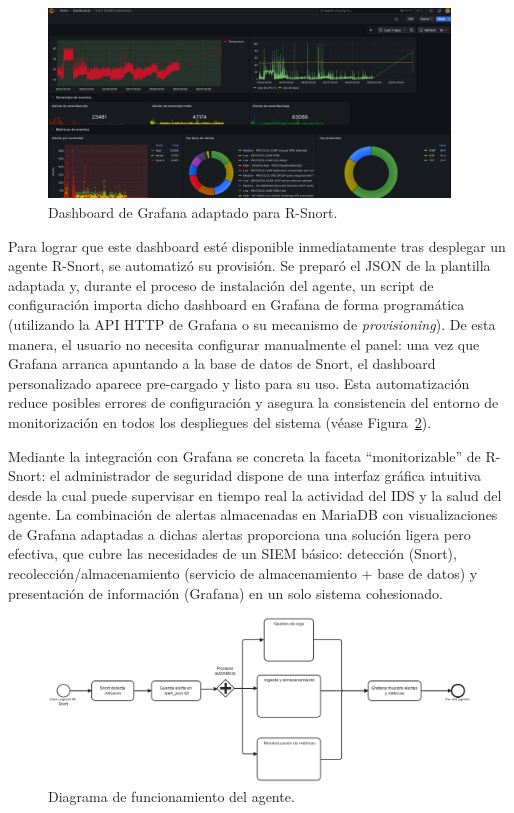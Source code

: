 \documentclass[11pt,a4paper,twoside]{report}
\begin{document}
\begin{figure}[H]
	\centering
	\includegraphics[width=0.95\textwidth]{documento/grafana1.png}
	\caption{Dashboard de Grafana adaptado para R-Snort.}
	\label{fig:grafana-dashboard}
\end{figure}

Para lograr que este dashboard esté disponible inmediatamente tras desplegar un agente R-Snort, se automatizó su provisión. Se preparó el JSON de la plantilla adaptada y, durante el proceso de instalación del agente, un script de configuración importa dicho dashboard en Grafana de forma programática (utilizando la API HTTP de Grafana o su mecanismo de \textit{provisioning}). De esta manera, el usuario no necesita configurar manualmente el panel: una vez que Grafana arranca apuntando a la base de datos de Snort, el dashboard personalizado aparece pre-cargado y listo para su uso. Esta automatización reduce posibles errores de configuración y asegura la consistencia del entorno de monitorización en todos los despliegues del sistema (véase Figura~\ref{fig:agent-bpmn}).\newline

Mediante la integración con Grafana se concreta la faceta “monitorizable” de R-Snort: el administrador de seguridad dispone de una interfaz gráfica intuitiva desde la cual puede supervisar en tiempo real la actividad del IDS y la salud del agente. La combinación de alertas almacenadas en MariaDB con visualizaciones de Grafana adaptadas a dichas alertas proporciona una solución ligera pero efectiva, que cubre las necesidades de un SIEM básico: detección (Snort), recolección/almacenamiento (servicio de almacenamiento + base de datos) y presentación de información (Grafana) en un solo sistema cohesionado.

\begin{figure}[H]
	\centering
	\includegraphics[width=1\textwidth]{documento/26.png}
	\caption{Diagrama de funcionamiento del agente.}
	\label{fig:agent-bpmn}
\end{figure}
\end{document}
